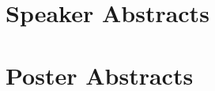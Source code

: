 \documentclass[a4paper,11pt,oneside, openany]{book}%
\begin{document}
\frontmatter
%

\tableofcontents
\mainmatter
\pagestyle{MyStyle}
\renewcommand{\thesection}{\arabic{section}}


\chapter{Speaker Abstracts}
\begingroup
\titleformat{\section}[block]{\bfseries\filcenter}{}{1em}{}
\renewcommand*{\thesection}{}

\endgroup
\chapter{Poster Abstracts}
\renewcommand{\thesection}{\arabic{section}}


\end{document}
